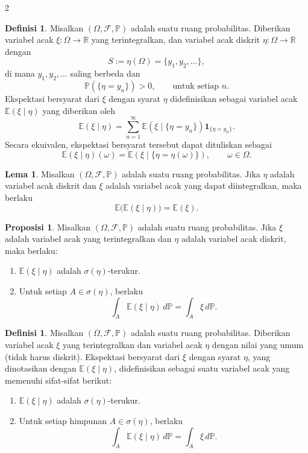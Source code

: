 \documentclass[a4paper,extrafontsizes, 9pt]{memoir}
\theoremstyle{definition}
\newtheorem{definisi}[kalstok]{Definisi}
\newtheorem{lemma}[kalstok]{Lema}
\newtheorem{proposisi}[kalstok]{Proposisi}
\theoremstyle{plain}
\theoremstyle{remark}
\begin{document}
\begin{multicols}{2}
  \begin{definisi}
    Misalkan $(\Omega,\mathcal{F},\mathbb{P})$ adalah suatu ruang probabilitas. Diberikan
    variabel acak $\xi:\Omega\to\mathbb{R}$ yang terintegralkan, dan variabel acak diskrit
    $\eta:\Omega\to\mathbb{R}$ dengan
    \[S:=\eta(\Omega)=\{y_1,y_2,\ldots\},\]
    di mana $y_1,y_2,\ldots$ saling berbeda dan
    \[\mathbb{P}(\{\eta=y_n\})>0,\qquad \text{untuk setiap }n.\]
    Ekspektasi bersyarat dari $\xi$ dengan syarat $\eta$ didefinisikan sebagai variabel acak
    $\mathbb{E}(\xi\mid\eta)$ yang diberikan oleh
    \[\mathbb{E}(\xi\mid\eta)
      =\sum_{n=1}^{\infty}\mathbb{E}(\xi\mid\{\eta=y_n\})\mathbf{1}_{\{\eta=y_n\}}.\]
    Secara ekuivalen, ekspektasi bersyarat tersebut dapat dituliskan sebagai
    \[\mathbb{E}(\xi\mid\eta)(\omega)=\mathbb{E}(\xi\mid\{\eta=\eta(\omega)\}),\qquad \omega\in\Omega.\]
  \end{definisi}

  \begin{lemma}
    Misalkan $(\Omega,\mathcal{F},\mathbb{P})$ adalah suatu ruang probabilitas.
    Jika $\eta$ adalah variabel acak diskrit dan $\xi$ adalah variabel acak yang dapat
    diintegralkan, maka berlaku
    \[\mathbb{E}\bigl(\mathbb{E}(\xi\mid\eta)\bigr)=\mathbb{E}(\xi).\]
  \end{lemma}

  \begin{proposisi}
    Misalkan $(\Omega,\mathcal{F},\mathbb{P})$ adalah suatu ruang probabilitas.
    Jika $\xi$ adalah variabel acak yang terintegralkan dan $\eta$ adalah variabel acak diskrit,
    maka berlaku:
    \begin{enumerate}[leftmargin=*, itemsep=0.5mm]
      \item $\mathbb{E}(\xi\mid\eta)$ adalah $\sigma(\eta)$-terukur.
      \item Untuk setiap $A\in\sigma(\eta)$, berlaku
            \[\int_A \mathbb{E}(\xi\mid\eta)\,d\mathbb{P}=\int_A \xi\,d\mathbb{P}.\]
    \end{enumerate}
  \end{proposisi}

  \begin{definisi}
    Misalkan $(\Omega,\mathcal{F},\mathbb{P})$ adalah suatu ruang probabilitas. Diberikan
    variabel acak $\xi$ yang terintegralkan dan variabel acak $\eta$ dengan nilai yang umum
    (tidak harus diskrit). Ekspektasi bersyarat dari $\xi$ dengan syarat $\eta$, yang
    dinotasikan dengan $\mathbb{E}(\xi\mid\eta)$, didefinisikan sebagai suatu variabel acak
    yang memenuhi sifat-sifat berikut:
    \begin{enumerate}[leftmargin=*, itemsep=0.5mm]
      \item $\mathbb{E}(\xi\mid\eta)$ adalah $\sigma(\eta)$-terukur.
      \item Untuk setiap himpunan $A\in\sigma(\eta)$, berlaku
            \[\int_A \mathbb{E}(\xi\mid\eta)\,d\mathbb{P}=\int_A \xi\,d\mathbb{P}.\]
    \end{enumerate}
  \end{definisi}


\end{multicols}
\end{document}
